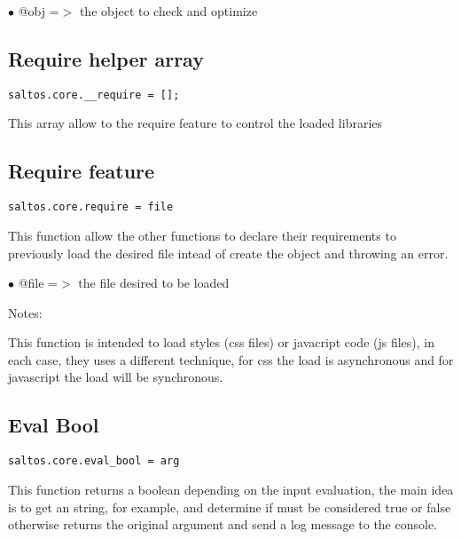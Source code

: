 \documentclass[a4paper]{book}
\begin{document}
\begin{compactitem}
\item[\color{myblue}$\bullet$] @obj =$>$ the object to check and optimize
\end{compactitem}

\hypertarget{toc521}{}
\subsection{Require helper array}

\begin{lstlisting}
saltos.core.__require = [];
\end{lstlisting}

This array allow to the require feature to control the loaded libraries

\hypertarget{toc522}{}
\subsection{Require feature}

\begin{lstlisting}
saltos.core.require = file
\end{lstlisting}

This function allow the other functions to declare their requirements to previously load the
desired file intead of create the object and throwing an error.

\begin{compactitem}
\item[\color{myblue}$\bullet$] @file =$>$ the file desired to be loaded
\end{compactitem}

Notes:

This function is intended to load styles (css files) or javacript code (js files), in each
case, they uses a different technique, for css the load is asynchronous and for javascript
the load will be synchronous.

\hypertarget{toc523}{}
\subsection{Eval Bool}

\begin{lstlisting}
saltos.core.eval_bool = arg
\end{lstlisting}

This function returns a boolean depending on the input evaluation, the main idea
is to get an string, for example, and determine if must be considered true or false
otherwise returns the original argument and send a log message to the console.
\end{document}
